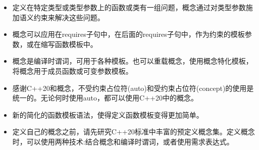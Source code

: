 \begin{tcolorbox}[breakable,enhanced jigsaw,colback=mygreen!5!white,colframe=mygreen!75!black,title=总结]
\begin{itemize}
\item 
定义在特定类型或类型参数上的函数或类有一组问题，概念通过对类型参数施加语义约束来解决这些问题。

\item 
概念可以应用在requires子句中，在后面的requires子句中，作为约束的模板参数，或在缩写函数模板中。

\item 
概念是编译时谓词，可用于各种模板。也可以重载概念，使用概念特化模板，将概念用于成员函数或可变参数模板。

\item 
感谢C++20和概念，不受约束占位符(auto)和受约束占位符(concept)的使用是统一的。无论何时使用auto，都可以使用C++20中的概念。

\item 
新的简化的函数模板语法，使得定义函数模板变得更加简单。

\item 
定义自己的概念之前，请先研究C++20标准中丰富的预定义概念集。定义概念时，可以使用两种技术:结合概念和编译时谓词，或者使用需求表达式。
\end{itemize}
\end{tcolorbox}



















